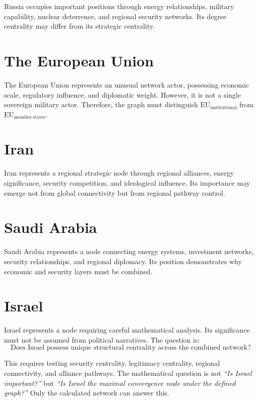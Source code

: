 \documentclass[11pt,openany]{book}
\theoremstyle{plain}
\theoremstyle{definition}
\begin{document}
Russia occupies important positions through energy relationships, military capability, nuclear deterrence, and regional security networks. Its degree centrality may differ from its strategic centrality.

\section*{The European Union}

The European Union represents an unusual network actor, possessing economic scale, regulatory influence, and diplomatic weight. However, it is not a single sovereign military actor. Therefore, the graph must distinguish \(\text{EU}_{\text{institutional}}\) from \(\text{EU}_{\text{member states}}\).

\section*{Iran}

Iran represents a regional strategic node through regional alliances, energy significance, security competition, and ideological influence. Its importance may emerge not from global connectivity but from regional pathway control.

\section*{Saudi Arabia}

Saudi Arabia represents a node connecting energy systems, investment networks, security relationships, and regional diplomacy. Its position demonstrates why economic and security layers must be combined.

\section*{Israel}

Israel represents a node requiring careful mathematical analysis. Its significance must not be assumed from political narratives. The question is:
\[
\boxed{
\text{Does Israel possess unique structural centrality across the combined network?}
}
\]

This requires testing security centrality, legitimacy centrality, regional connectivity, and alliance pathways. The mathematical question is not \textit{``Is Israel important?''} but \textit{``Is Israel the maximal convergence node under the defined graph?''} Only the calculated network can answer this.
\end{document}
